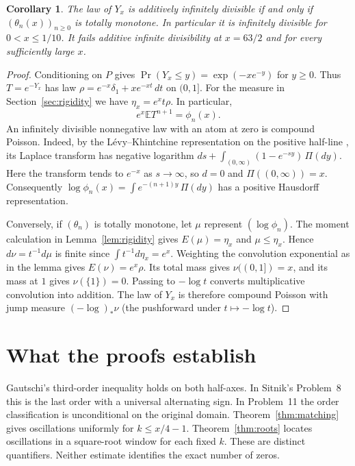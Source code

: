 \documentclass[11pt,a4paper]{article}
\newtheorem{corollary}[theorem]{Corollary}
\begin{document}
\begin{corollary}\label{cor:poissonmax}
The law of $Y_x$ is additively infinitely divisible if and only if $(\theta_n(x))_{n\ge0}$ is totally monotone. In particular it is infinitely divisible for $0<x\le1/10$. It fails additive infinite divisibility at $x=63/2$ and for every sufficiently large $x$.
\end{corollary}
\begin{proof}
Conditioning on $P$ gives $\Pr(Y_x\le y)=\exp(-xe^{-y})$ for $y\ge0$. Thus $T=e^{-Y_x}$ has law $\rho=e^{-x}\delta_1+xe^{-xt}\,dt$ on $(0,1]$. For the measure in Section~\ref{sec:rigidity} we have $\eta_x=e^x t\rho$. In particular,
\[
 e^x\mathbb E T^{n+1}=\phi_n(x).
\]
An infinitely divisible nonnegative law with an atom at zero is compound Poisson. Indeed, by the L\'evy--Khintchine representation on the positive half-line \cite{sato}, its Laplace transform has negative logarithm
$d s+\int_{(0,\infty)}(1-e^{-sy})\,\Pi(dy)$.
Here the transform tends to $e^{-x}$ as $s\to\infty$, so $d=0$ and $\Pi((0,\infty))=x$. Consequently
$\log\phi_n(x)=\int e^{-(n+1)y}\,\Pi(dy)$ has a positive Hausdorff representation.

Conversely, if $(\theta_n)$ is totally monotone, let $\mu$ represent $(\log\phi_n)$. The moment calculation in Lemma~\ref{lem:rigidity} gives $E(\mu)=\eta_x$ and $\mu\le\eta_x$. Hence $d\nu=t^{-1}d\mu$ is finite since $\int t^{-1}d\eta_x=e^x$. Weighting the convolution exponential as in the lemma gives $E(\nu)=e^x\rho$. Its total mass gives $\nu((0,1])=x$, and its mass at $1$ gives $\nu(\{1\})=0$. Passing to $-\log t$ converts multiplicative convolution into addition. The law of $Y_x$ is therefore compound Poisson with jump measure $(-\log)_*\nu$ (the pushforward under $t\mapsto-\log t$).
\end{proof}

\section{What the proofs establish}
Gautschi's third-order inequality holds on both half-axes. In Sitnik's Problem~8 this is the last order with a universal alternating sign. In Problem~11 the order classification is unconditional on the original domain. Theorem~\ref{thm:matching} gives oscillations uniformly for $k\le x/4-1$. Theorem~\ref{thm:roots} locates oscillations in a square-root window for each fixed $k$. These are distinct quantifiers. Neither estimate identifies the exact number of zeros.
\end{document}
